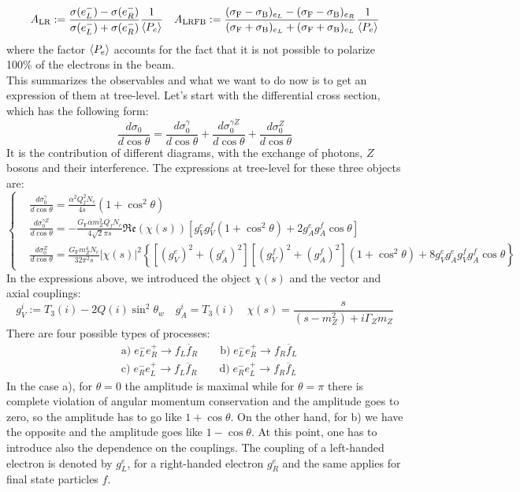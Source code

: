 \documentclass[../main.tex]{subfiles}
\begin{document}
\[
A_{\text{LR}}:=\frac{\sigma(e_L^-)-\sigma(e_R^-)}{\sigma(e_L^-)+\sigma(e_R^-)}\frac{1}{\Braket{P_e}} \quad A_{\text{LRFB}}:=\frac{(\sigma_{\text{F}}-\sigma_{\text{B}})_{e_L}-(\sigma_{\text{F}}-\sigma_{\text{B}})_{e_R}}{(\sigma_{\text{F}}+\sigma_{\text{B}})_{e_L}+(\sigma_{\text{F}}+\sigma_{\text{B}})_{e_L}}\frac{1}{\Braket{P_e}}
\]
where the factor $\Braket{P_e}$ accounts for the fact that it is not possible to polarize 100\% of the electrons in the beam.\\
This summarizes the observables and what we want to do now is to get an expression of them at tree-level. Let's start with the differential cross section, which has the following form:
\[
\frac{d\sigma_0}{d\cos\theta}=\frac{d\sigma_0^\gamma}{d\cos\theta}+\frac{d\sigma_0^{\gamma Z}}{d\cos\theta}+\frac{d\sigma_0^Z}{d\cos\theta}
\]
It is the contribution of different diagrams, with the exchange of photons, $Z$ bosons and their interference. The expressions at tree-level for these three objects are:
\[
\left\{
\begin{aligned}
&\frac{d\sigma_0^\gamma}{d\cos\theta}=\frac{\alpha^2Q_f^2N_c}{4s}(1+\cos^2\theta)\\
&\frac{d\sigma_0^{\gamma Z}}{d\cos\theta}=-\frac{G_{\text{F}}\alpha m_Z^2Q_fN_c}{4\sqrt{2}\pi s}\mathfrak{Re}(\chi(s))\left[g_V^eg_V^f(1+\cos^2\theta)+2g_A^eg_A^f\cos\theta\right]\\
&\frac{d\sigma_0^Z}{d\cos\theta}=\frac{G_{\text{F}}m_Z^4N_c}{32\pi^2 s}|\chi(s)|^2\left\{[(g_V^e)^2+(g_A^e)^2][(g_V^f)^2+(g_A^f)^2](1+\cos^2\theta)+8g_V^eg_A^eg_V^fg_A^f\cos\theta\right\}
\end{aligned}
\right.
\]
In the expressions above, we introduced the object $\chi(s)$ and the vector and axial couplings:
\[
g_V^i:=T_3(i)-2Q(i)\sin^2\theta_w \quad g_A^i=T_3(i) \quad \chi(s)=\frac{s}{(s-m_Z^2)+i\Gamma_Zm_Z}
\]
There are four possible types of processes:
\[
\begin{aligned}
&\text{a)}\;e_L^-e_R^+\to f_L\overline{f}_R \qquad \text{b)}\; e_L^-e_R^+\to f_R\overline{f}_L\\
&\text{c)}\; e_R^-e_L^+\to f_L\overline{f}_R \qquad
\text{d)}\; e_R^-e_L^+\to f_R\overline{f}_L
\end{aligned}
\]
In the case a), for $\theta=0$ the amplitude is maximal while for $\theta=\pi$ there is complete violation of angular momentum conservation and the amplitude goes to zero, so the amplitude has to go like $1+\cos\theta$. On the other hand, for b) we have the opposite and the amplitude goes like $1-\cos\theta$. At this point, one has to introduce also the dependence on the couplings. The coupling of a left-handed electron is denoted by $g_L^e$, for a right-handed electron $g_R^e$ and the same applies for final state particles $f$.
\end{document}
